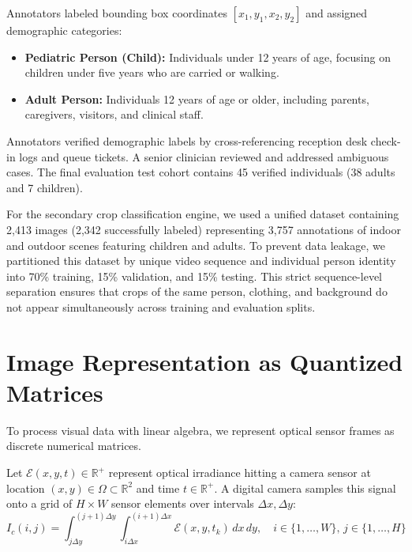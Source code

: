 Annotators labeled bounding box coordinates $[x_1, y_1, x_2, y_2]$ and assigned demographic categories:
\begin{itemize}
    \item \textbf{Pediatric Person (Child):} Individuals under 12 years of age, focusing on children under five years who are carried or walking.
    \item \textbf{Adult Person:} Individuals 12 years of age or older, including parents, caregivers, visitors, and clinical staff.
\end{itemize}
Annotators verified demographic labels by cross-referencing reception desk check-in logs and queue tickets. A senior clinician reviewed and addressed ambiguous cases. The final evaluation test cohort contains 45 verified individuals (38 adults and 7 children).

For the secondary crop classification engine, we used a unified dataset containing 2,413 images (2,342 successfully labeled) representing 3,757 annotations of indoor and outdoor scenes featuring children and adults. To prevent data leakage, we partitioned this dataset by unique video sequence and individual person identity into 70\% training, 15\% validation, and 15\% testing. This strict sequence-level separation ensures that crops of the same person, clothing, and background do not appear simultaneously across training and evaluation splits.

\section{Image Representation as Quantized Matrices}
To process visual data with linear algebra, we represent optical sensor frames as discrete numerical matrices.

\begin{definition}
Let $\mathcal{E}(x, y, t) \in \mathbb{R}^+$ represent optical irradiance hitting a camera sensor at location $(x, y) \in \Omega \subset \mathbb{R}^2$ and time $t \in \mathbb{R}^+$. A digital camera samples this signal onto a grid of $H \times W$ sensor elements over intervals $\Delta x, \Delta y$:
\begin{equation}
    I_c(i, j) = \int_{j\Delta y}^{(j+1)\Delta y} \int_{i\Delta x}^{(i+1)\Delta x} \mathcal{E}(x, y, t_k) \, dx \, dy, \quad i \in \{1, \dots, W\}, \, j \in \{1, \dots, H\}
\end{equation}
\end{definition}

